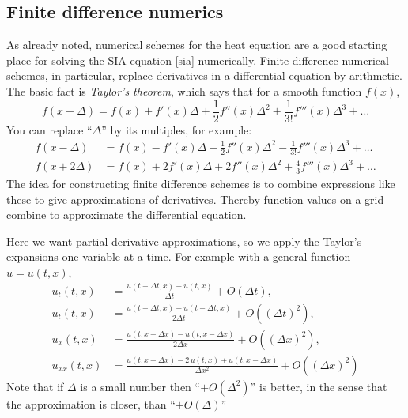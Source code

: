 \documentclass[titlepage,a4paper,final,12pt]{scrartcl}
\begin{document}
\subsection{Finite difference numerics} 

As already noted, numerical schemes for the heat equation are a good starting place for solving the SIA equation \eqref{sia} numerically.  Finite difference numerical schemes, in particular, replace derivatives in a differential equation by arithmetic.  The basic fact is \emph{Taylor's theorem}, which says that for a smooth function $f(x)$,
	$$f(x+\Delta) = f(x) + f'(x) \Delta + \frac{1}{2} f''(x) \Delta^2 + \frac{1}{3!} f'''(x) \Delta^3 + \dots$$
You can replace ``$\Delta$'' by its multiples, for example:
\begin{align*}
f(x-\Delta) &= f(x) - f'(x) \Delta + \frac{1}{2} f''(x) \Delta^2 - \frac{1}{3!} f'''(x) \Delta^3 + \dots \\
f(x+2\Delta) &= f(x) + 2 f'(x) \Delta + 2 f''(x) \Delta^2 + \frac{4}{3} f'''(x) \Delta^3 + \dots
\end{align*}
The idea for constructing finite difference schemes is to combine expressions like these to give approximations of derivatives.  Thereby function values on a grid combine to approximate the differential equation.

Here we want partial derivative approximations, so we apply the Taylor's expansions one variable at a time.  For example with a general function $u=u(t,x)$,
\begin{align*}
u_t(t,x) &= \frac{u(t+\Delta t,x) - u(t,x)}{\Delta t} + O(\Delta t), \\
u_t(t,x) &= \frac{u(t+\Delta t,x) - u(t-\Delta t,x)}{2\Delta t} + O((\Delta t)^2), \\
u_x(t,x) &= \frac{u(t,x+\Delta x) - u(t,x-\Delta x)}{2\Delta x} + O((\Delta x)^2), \\
u_{xx}(t,x) &= \frac{u(t,x+\Delta x) - 2\, u(t,x) + u(t,x-\Delta x)}{\Delta x^2} + O((\Delta x)^2)
\end{align*}
Note that if $\Delta$ is a small number then ``$+O(\Delta^2)$'' is better, in the sense that the approximation is closer, than ``$+O(\Delta)$''
\end{document}
